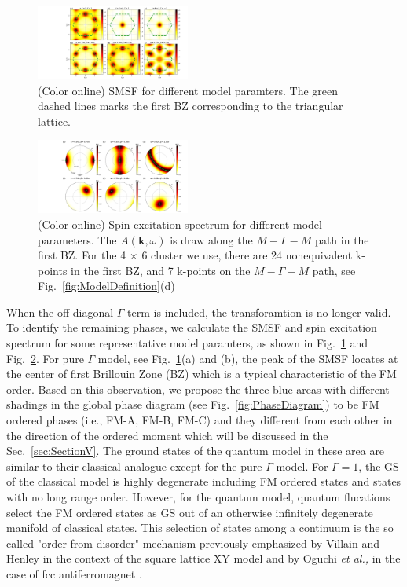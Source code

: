 \documentclass[aps,prb,reprint,amsfonts,amsmath,amssymb,showpacs,groupedaddress,superscriptaddress]{revtex4-1}
\begin{document}
\begin{figure}
    \includegraphics[width=0.45\textwidth]{Fig3.pdf}
    \caption{\label{fig:StructureFactors}(Color online) SMSF for different model paramters. The green dashed lines marks the first BZ corresponding to the triangular lattice.}
\end{figure}
\begin{figure}
    \includegraphics[width=0.45\textwidth]{Fig4.pdf}
    \caption{\label{fig:Spectrum}(Color online) Spin excitation spectrum for different model parameters. The $A(\bm{k}, \omega)$ is draw along the $M-\Gamma-M$ path in the first BZ. For the 4 $\times$ 6 cluster we use, there are 24 nonequivalent k-points in the first BZ, and 7 k-points on the $M-\Gamma-M$ path, see Fig.~\ref{fig:ModelDefinition}(d)}
\end{figure}

When the off-diagonal $\Gamma$ term is included, the transforamtion is no longer valid. To identify the remaining phases, we calculate the SMSF and spin excitation spectrum for some representative model paramters, as shown in Fig.~\ref{fig:StructureFactors} and Fig.~\ref{fig:Spectrum}. For pure $\Gamma$ model, see Fig.~\ref{fig:StructureFactors}(a) and (b), the peak of the SMSF locates at the center of first Brillouin Zone (BZ) which is a typical characteristic of the FM order. Based on this observation, we propose the three blue areas with different shadings in the global phase diagram (see Fig.~\ref{fig:PhaseDiagram}) to be FM ordered phases (i.e., FM-A, FM-B, FM-C) and they different from each other in the direction of the ordered moment which will be discussed in the Sec.~\ref{sec:SectionV}. The ground states of the quantum model in these area are similar to their classical analogue except for the pure $\Gamma$ model. For $\Gamma=1$, the GS of the classical model is highly degenerate including FM ordered states and states with no long range order. However, for the quantum model, quantum flucations select the FM ordered states as GS out of an otherwise infinitely degenerate manifold of classical states. This selection of states among a continuum is the so called "order-from-disorder" mechanism previously emphasized by Villain and Henley in the context of the square lattice XY model \cite{PhysRevLett.62.2056} and by Oguchi \emph{et al.,} in the case of fcc antiferromagnet \cite{JPSJ.54.4494}.
\end{document}
